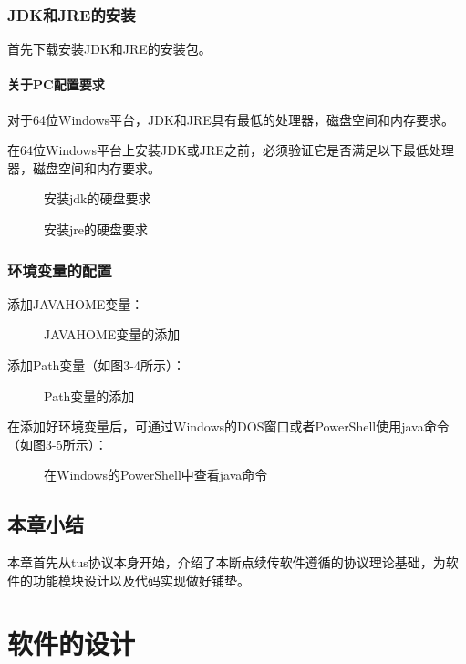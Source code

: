 \documentclass[bachelor]{thesis-uestc}
\begin{document}
\subsection{JDK和JRE的安装}
首先下载安装JDK和JRE的安装包。
\subsubsection{关于PC配置要求}
对于64位Windows平台，JDK和JRE具有最低的处理器，磁盘空间和内存要求。
\par 在64位Windows平台上安装JDK或JRE之前，必须验证它是否满足以下最低处理器，磁盘空间和内存要求。
\begin{figure}[h]
\caption{安装jdk的硬盘要求}
\end{figure}

\begin{figure}[h]
\caption{安装jre的硬盘要求}
\end{figure}

\subsection{环境变量的配置}
添加JAVAHOME变量：
\begin{figure}[h]
\caption{JAVAHOME变量的添加}
\end{figure}
\par 添加Path变量（如图3-4所示）：
\begin{figure}[h]
\caption{Path变量的添加}
\end{figure}
\par 在添加好环境变量后，可通过Windows的DOS窗口或者PowerShell使用java命令（如图3-5所示）：
\begin{figure}[h]
\caption{在Windows的PowerShell中查看java命令}
\end{figure}

\section{本章小结}
本章首先从tus协议本身开始，介绍了本断点续传软件遵循的协议理论基础，为软件的功能模块设计以及代码实现做好铺垫。

\chapter{软件的设计}
\end{document}
